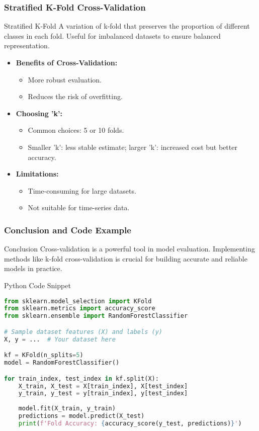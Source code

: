 \documentclass[aspectratio=169]{beamer}
\begin{document}
\begin{frame}[fragile]
    \frametitle{Stratified K-Fold Cross-Validation}
    \begin{block}{Stratified K-Fold}
        A variation of k-fold that preserves the proportion of different classes in each fold. Useful for imbalanced datasets to ensure balanced representation.
    \end{block}
    \begin{itemize}
        \item \textbf{Benefits of Cross-Validation:}
            \begin{itemize}
                \item More robust evaluation.
                \item Reduces the risk of overfitting.
            \end{itemize}
        \item \textbf{Choosing 'k':}
            \begin{itemize}
                \item Common choices: 5 or 10 folds.
                \item Smaller 'k': less stable estimate; larger 'k': increased cost but better accuracy.
            \end{itemize}
        \item \textbf{Limitations:}
            \begin{itemize}
                \item Time-consuming for large datasets.
                \item Not suitable for time-series data.
            \end{itemize}
    \end{itemize}
\end{frame}

\begin{frame}[fragile]
    \frametitle{Conclusion and Code Example}
    \begin{block}{Conclusion}
        Cross-validation is a powerful tool in model evaluation. Implementing methods like k-fold cross-validation is crucial for building accurate and reliable models in practice.
    \end{block}
    \begin{block}{Python Code Snippet}
    \begin{lstlisting}[language=Python]
from sklearn.model_selection import KFold
from sklearn.metrics import accuracy_score
from sklearn.ensemble import RandomForestClassifier

# Sample dataset features (X) and labels (y)
X, y = ...  # Your dataset here

kf = KFold(n_splits=5)
model = RandomForestClassifier()

for train_index, test_index in kf.split(X):
    X_train, X_test = X[train_index], X[test_index]
    y_train, y_test = y[train_index], y[test_index]
    
    model.fit(X_train, y_train)
    predictions = model.predict(X_test)
    print(f'Fold Accuracy: {accuracy_score(y_test, predictions)}')
    \end{lstlisting}
    \end{block}
\end{frame}
\end{document}
